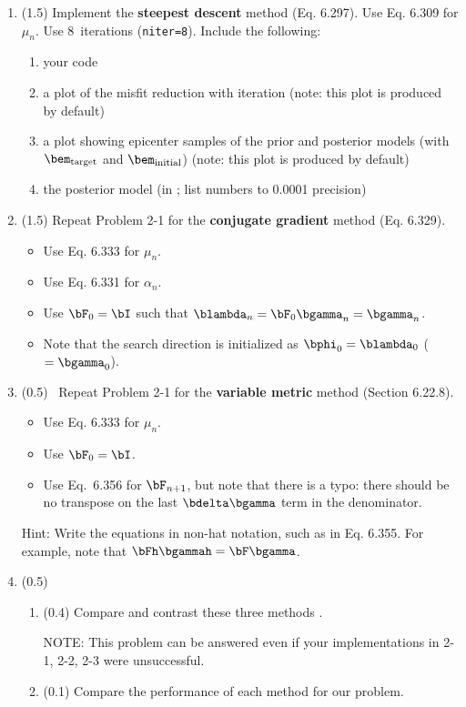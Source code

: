 \documentclass[11pt,titlepage,fleqn]{article}
\begin{document}
\begin{enumerate}
\item (1.5) Implement the {\bf steepest descent} method (Eq. 6.297). Use Eq. 6.309 for $\mu_n$. Use 8~iterations (\verb+niter=8+). Include the following:
%
\begin{enumerate}
\item your code
\item a plot of the misfit reduction with iteration (note: this plot is produced by default)
\item a plot showing epicenter samples of the prior and posterior models (with $\bem_{\rm target}$ and $\bem_{\rm initial}$) (note: this plot is produced by default)
\item the posterior model (in ; list numbers to 0.0001 precision)
\end{enumerate}

\label{steep}

\item (1.5) Repeat Problem 2-1 for the {\bf conjugate gradient} method (Eq. 6.329).
%
\begin{itemize}
\item Use Eq. 6.333 for $\mu_n$.
\item Use Eq. 6.331 for $\alpha_n$.
\item Use $\bF_0 = \bI$ such that $\blambda_n = \bF_0\bgamma_n = \bgamma_n$. 
\item Note that the search direction is initialized as $\bphi_0 = \blambda_0$ ($= \bgamma_0$).
\end{itemize}

\item (0.5) \ptag\ Repeat Problem 2-1 for the {\bf variable metric} method (Section 6.22.8).
%
\begin{itemize}
\item Use Eq. 6.333 for $\mu_n$.
\item Use $\bF_0 = \bI$.
\item Use Eq.~6.356 for $\bF_{n+1}$, but note that there is a typo: there should be no transpose on the last $\bdelta\bgamma$ term in the denominator.
\end{itemize}
%
Hint: Write the equations in non-hat notation, such as in Eq. 6.355. For example, note that $\bFh\bgammah = \bF\bgamma$.

\item (0.5)
%
\begin{enumerate}
\item (0.4) Compare and contrast these three methods \citep[see][]{Tarantola2005}.

NOTE: This problem can be answered even if your implementations in 2-1, 2-2, 2-3 were unsuccessful.

\item (0.1) Compare the performance of each method for our problem.
\end{enumerate}

\end{enumerate}
\end{document}
